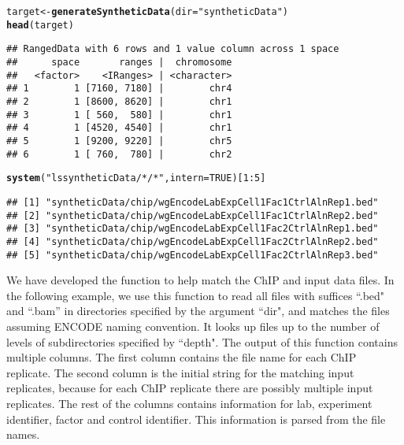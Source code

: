 \documentclass[a4paper,10pt]{article}\usepackage[]{graphicx}\usepackage[]{color}
\makeatletter
\newcommand{\hlnum}[1]{\textcolor[rgb]{0.686,0.059,0.569}{#1}}%
\newcommand{\hlstr}[1]{\textcolor[rgb]{0.192,0.494,0.8}{#1}}%
\newcommand{\hlopt}[1]{\textcolor[rgb]{0,0,0}{#1}}%
\newcommand{\hlstd}[1]{\textcolor[rgb]{0.345,0.345,0.345}{#1}}%
\newcommand{\hlkwb}[1]{\textcolor[rgb]{0.69,0.353,0.396}{#1}}%
\newcommand{\hlkwc}[1]{\textcolor[rgb]{0.333,0.667,0.333}{#1}}%
\newcommand{\hlkwd}[1]{\textcolor[rgb]{0.737,0.353,0.396}{\textbf{#1}}}%
\newenvironment{kframe}{%
 \def\at@end@of@kframe{}%
 \ifinner\ifhmode%
  \def\at@end@of@kframe{\end{minipage}}%
  \begin{minipage}{\columnwidth}%
 \fi\fi%
 \def\FrameCommand##1{\hskip\@totalleftmargin \hskip-\fboxsep
 \colorbox{shadecolor}{##1}\hskip-\fboxsep
     \hskip-\linewidth \hskip-\@totalleftmargin \hskip\columnwidth}%
 \MakeFramed {\advance\hsize-\width
   \@totalleftmargin\z@ \linewidth\hsize
   \@setminipage}}%
 {\par\unskip\endMakeFramed%
 \at@end@of@kframe}
\newenvironment{knitrout}{}{} %
\makeatother
\begin{document}
\begin{knitrout}
\color{fgcolor}\begin{kframe}
\begin{alltt}
\hlstd{target} \hlkwb{<-} \hlkwd{generateSyntheticData}\hlstd{(}\hlkwc{dir} \hlstd{=} \hlstr{"syntheticData"}\hlstd{)}
\hlkwd{head}\hlstd{(target)}
\end{alltt}
\begin{verbatim}
## RangedData with 6 rows and 1 value column across 1 space
##      space       ranges |  chromosome
##   <factor>    <IRanges> | <character>
## 1        1 [7160, 7180] |        chr4
## 2        1 [8600, 8620] |        chr1
## 3        1 [ 560,  580] |        chr1
## 4        1 [4520, 4540] |        chr1
## 5        1 [9200, 9220] |        chr5
## 6        1 [ 760,  780] |        chr2
\end{verbatim}
\begin{alltt}
\hlkwd{system}\hlstd{(}\hlstr{"ls syntheticData/*/*"}\hlstd{,} \hlkwc{intern} \hlstd{=} \hlnum{TRUE}\hlstd{)[}\hlnum{1}\hlopt{:}\hlnum{5}\hlstd{]}
\end{alltt}
\begin{verbatim}
## [1] "syntheticData/chip/wgEncodeLabExpCell1Fac1CtrlAlnRep1.bed"
## [2] "syntheticData/chip/wgEncodeLabExpCell1Fac1CtrlAlnRep2.bed"
## [3] "syntheticData/chip/wgEncodeLabExpCell1Fac2CtrlAlnRep1.bed"
## [4] "syntheticData/chip/wgEncodeLabExpCell1Fac2CtrlAlnRep2.bed"
## [5] "syntheticData/chip/wgEncodeLabExpCell1Fac2CtrlAlnRep3.bed"
\end{verbatim}
\end{kframe}
\end{knitrout}

We have developed the  function to help match the ChIP and input data files. In the following example, we use this function to read all files with suffices ``.bed" and ``.bam'' in directories specified by the argument ``dir", and matches the files assuming ENCODE naming convention. It looks up files up to the number of levels of subdirectories specified by ``depth". The output of this function contains multiple columns. The first column contains the file name for each ChIP replicate. The second column is the initial string for the matching input replicates, because for each ChIP replicate there are possibly multiple input replicates. The rest of the columns contains information for lab, experiment identifier, factor and control identifier. This information is parsed from the file names.
\end{document}
